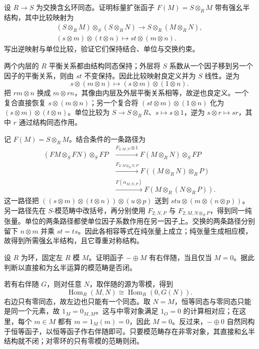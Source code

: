 \begin{exercise}\label{b4:ex:monoidal-extension-scalars}
	设 \(R\to S\) 为交换含幺环同态。证明标量扩张函子 \(F(M)=S\otimes_RM\) 带有强幺半结构，其中比较映射为
	\[
		\begin{gathered}
			(S\otimes_RM)\otimes_S(S\otimes_RN)\longrightarrow S\otimes_R(M\otimes_RN),
			\\
			(s\otimes m)\otimes(t\otimes n)\longmapsto st\otimes(m\otimes n).
		\end{gathered}
	\]
	写出逆映射与单位比较，验证它们保持结合、单位与交换约束。
\end{exercise}
\begin{solution}
	两个内层的 \(R\) 平衡关系都由结构同态保持；外层将 \(S\) 系数从一个因子移到另一个因子的平衡关系，则由 \(st\) 不变保持。因此比较映射良定义并为 \(S\) 线性。逆为
	\[
		s\otimes(m\otimes n)\longmapsto(s\otimes m)\otimes(1\otimes n).
	\]
	把 \(rm\otimes n\) 换成 \(m\otimes rn\)，其像由内层及外层平衡关系相等，故逆也良定义。一个复合直接恢复 \(s\otimes(m\otimes n)\)；另一个复合将 \((st\otimes m)\otimes(1\otimes n)\) 化为 \((s\otimes m)\otimes(t\otimes n)\)。单位比较为 \(S\to S\otimes_RR\)、\(s\mapsto s\otimes1\)，逆为 \(s\otimes r\mapsto s r\)，其中 \(r\) 通过结构同态作用。

	记 \(F(M)=S\otimes_RM\)。结合条件的一条路径为
	\[
		\begin{aligned}
			(FM\otimes_SFN)\otimes_SFP &\xrightarrow{F_{2;M,N}\otimes1}F(M\otimes_RN)\otimes_SFP\\
			&\xrightarrow{F_{2;M\otimes_RN,P}}F((M\otimes_RN)\otimes_RP)\\
			&\xrightarrow{F(\alpha_{M,N,P})}F(M\otimes_R(N\otimes_RP)).
		\end{aligned}
	\]
	这一路径把 \(((s\otimes m)\otimes(t\otimes n))\otimes(u\otimes p)\) 送到 \(stu\otimes(m\otimes(n\otimes p))\)。另一路径先在 \(S\)-模范畴中改括号，再分别使用 \(F_{2;N,P}\) 与 \(F_{2;M,N\otimes_RP}\)，得到同一纯张量。单位的两条路径都使单位因子系数作用在另一因子上。交换的两条路径分别留下 \(n\otimes m\) 并乘 \(st=ts\)。因此各相容等式在纯张量上成立；纯张量生成相应模，故得到所需强幺半结构，且它尊重对称结构。
\end{solution}

\begin{exercise}\label{b4:ex:direct-sum-not-closed}
	设 \(R\) 为环，固定左 \(R\) 模 \(M\)。证明函子 \(-\oplus M\) 有右伴随，当且仅当 \(M=0\)。据此判断以直接和为幺半运算的模范畴是否闭。
\end{exercise}
\begin{solution}
	若有右伴随 \(G\)，则对任意 \(N\)，取伴随的源为零模，得到
	\[
		\operatorname{Hom}_R(M,N) \cong\operatorname{Hom}_R(0,G(N)).
	\]
	右边只有零同态，故左边也只能有一个同态。取 \(N=M\)，恒等同态与零同态只能是同一个元素，故 \(1_M=0_{M,M}\)。这与中零对象满足 \(1_O=0\) 的计算相对应；在这里，每个 \(m\in M\) 都有 \(m=1_M(m)=0\)，因此 \(M=0\)。反过来，\(-\oplus0\) 自然同构于恒等函子，以恒等函子作右伴随即可。只要模范畴存在非零对象，其直接和幺半结构就不闭；对零环的只有零模的范畴则闭。
\end{solution}

